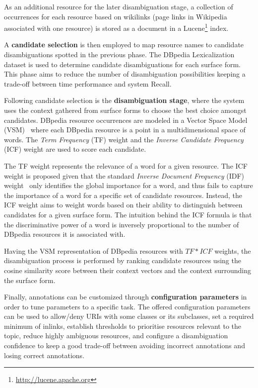 As an additional resource for the later disambiguation stage, a collection of occurrences for 
each resource based on wikilinks (page links in Wikipedia associated with one resource) is 
stored as a document in a Lucene\footnote{\url{http://lucene.apache.org}} index.

A \textbf{candidate selection} is then employed to map resource names to candidate 
disambiguations spotted in the previous phase. The DBpedia Lexicalization dataset is used to 
determine candidate disambiguations for each surface form. This phase aims to reduce the 
number of disambiguation possibilities keeping a trade-off between time performance and 
system Recall. 

Following candidate selection is the \textbf{disambiguation stage}, where the system uses 
the context gathered from surface forms to choose the best choice amongst candidates. 
DBpedia resource occurrences are modeled in a Vector Space Model (VSM)~\cite{infExtr:SaltonWY75} 
where each DBpedia resource is a point in a multidimensional space of words. The \textit{Term 
Frequency} (TF) weight and the \textit{Inverse Candidate Frequency} (ICF) weight are 
used to score each candidate. 

The TF weight represents the relevance of a word for a given resource. The ICF weight is 
proposed given that the standard \textit{Inverse Document Frequency} (IDF) 
weight~\cite{infExtr:Jones04} only identifies the global importance for a word, and thus 
fails to capture the importance of a word for a specific set of candidate resources. Instead, 
the ICF weight aims to weight words based on their ability to distinguish between candidates 
for a given surface form. The intuition behind the ICF formula is that the discriminative power 
of a word is inversely proportional to the number of DBpedia resources it is associated with. 

Having the VSM representation of DBpedia resources with $TF \ast ICF$ weights, the 
disambiguation process is performed by ranking candidate resources using the cosine 
similarity score between their context vectors and the context surrounding the surface form.

Finally, annotations can be customized through \textbf{configuration parameters} in order to 
tune parameters to a specific task. The offered configuration parameters can be used to 
allow/deny URIs with some classes or its subclasses, set a required minimum of inlinks, 
establish thresholds to prioritise resources relevant to the topic, reduce highly ambiguous 
resources, and configure a disambiguation confidence to keep a good trade-off between avoiding 
incorrect annotations and losing correct annotations.


